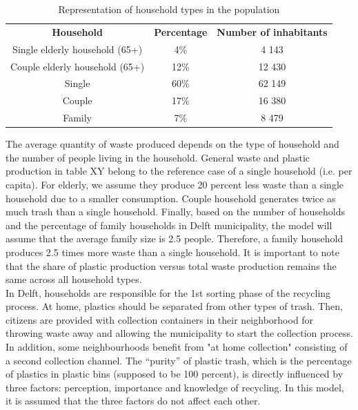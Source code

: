 \begin{table}[h]
\centering
\caption{Representation of household types in the population}
\begin{tabular}{ccc}
\rowcolor[HTML]{666666} 
{\color[HTML]{FFFFFF} \textbf{Household}} & {\color[HTML]{FFFFFF} \textbf{Percentage}} & {\color[HTML]{FFFFFF} \textbf{Number of inhabitants}} \\
Single elderly household (65+)            & 4\%                                        & 4 143                                                 \\
Couple elderly household (65+)            & 12\%                                       & 12 430                                                \\
Single                                    & 60\%                                       & 62 149                                                \\
Couple                                    & 17\%                                       & 16 380                                                \\
Family                                    & 7\%                                        & 8 479                                                
\end{tabular}
\end{table}

\noindent The average quantity of waste produced depends on the type of household and the number of people living in the household. General waste and plastic production in table XY belong to the reference case of a single household (i.e. per capita). For elderly, we assume they produce 20 percent less waste than a single household due to a smaller consumption. Couple household generates twice as much trash than a single household. Finally, based on the number of households and the percentage of family households in Delft municipality, the model will assume that the average family size is 2.5 people. Therefore, a family household produces 2.5 times more waste than a single household. It is important to note that the share of plastic production versus total waste production remains the same across all household types.\\

\noindent In Delft, households are responsible for the 1st sorting phase of the recycling process. At home, plastics should be separated from other types of trash. Then, citizens are provided with collection containers in their neighborhood for throwing waste away and allowing the municipality to start the collection process. In addition, some neighbourhoods benefit from "at home collection" consisting of a second collection channel. The “purity” of plastic trash, which is the percentage of plastics in plastic bins (supposed to be 100 percent), is directly influenced by three factors: perception, importance and knowledge of recycling. In this model, it is assumed that the three factors do not affect each other. \\

